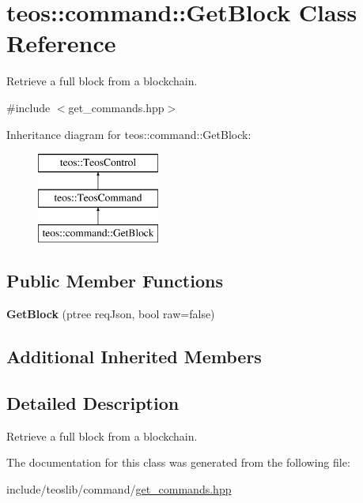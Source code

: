 \hypertarget{classteos_1_1command_1_1_get_block}{}\section{teos\+:\+:command\+:\+:Get\+Block Class Reference}
\label{classteos_1_1command_1_1_get_block}


Retrieve a full block from a blockchain.  




{\ttfamily \#include $<$get\+\_\+commands.\+hpp$>$}

Inheritance diagram for teos\+:\+:command\+:\+:Get\+Block\+:\begin{figure}[H]
\begin{center}
\leavevmode
\includegraphics[height=3.000000cm]{classteos_1_1command_1_1_get_block}
\end{center}
\end{figure}
\subsection*{Public Member Functions}
\begin{DoxyCompactItemize}
\item 
\mbox{\label{classteos_1_1command_1_1_get_block_a2e422461f3a01ea1f1514f69b3a55fec}} 
{\bfseries Get\+Block} (ptree req\+Json, bool raw=false)
\end{DoxyCompactItemize}
\subsection*{Additional Inherited Members}


\subsection{Detailed Description}
Retrieve a full block from a blockchain. 

The documentation for this class was generated from the following file\+:\begin{DoxyCompactItemize}
\item 
include/teoslib/command/\mbox{\hyperlink{get__commands_8hpp}{get\+\_\+commands.\+hpp}}\end{DoxyCompactItemize}
